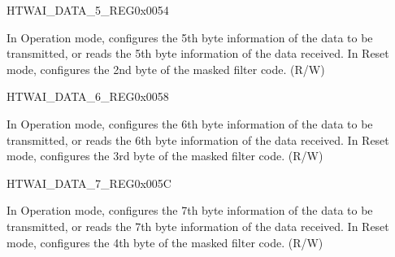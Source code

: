 \begin{register}{H}{TWAI\_DATA\_5\_REG}{0x0054}\label{regdesc:TWAIDATA5REG}
%
%
\regnewline%
\begin{regdesc}\begin{reglist}
\label{fielddesc:TWAIDATA5}\item [TWAI\_DATA\_5] In Operation mode, configures the 5th byte information of the data to be transmitted, or reads the 5th byte information of the data received. In Reset mode, configures the 2nd byte of the masked filter code. (R/W)
\end{reglist}\end{regdesc}
\end{register}


\begin{register}{H}{TWAI\_DATA\_6\_REG}{0x0058}\label{regdesc:TWAIDATA6REG}
%
%
\regnewline%
\begin{regdesc}\begin{reglist}
\label{fielddesc:TWAIDATA6}\item [TWAI\_DATA\_6] In Operation mode, configures the 6th byte information of the data to be transmitted, or reads the 6th byte information of the data received. In Reset mode, configures the 3rd byte of the masked filter code. (R/W)
\end{reglist}\end{regdesc}
\end{register}


\begin{register}{H}{TWAI\_DATA\_7\_REG}{0x005C}\label{regdesc:TWAIDATA7REG}
%
%
\regnewline%
\begin{regdesc}\begin{reglist}
\label{fielddesc:TWAIDATA7}\item [TWAI\_DATA\_7] In Operation mode, configures the 7th byte information of the data to be transmitted, or reads the 7th byte information of the data received. In Reset mode, configures the 4th byte of the masked filter code. (R/W)
\end{reglist}\end{regdesc}
\end{register}



